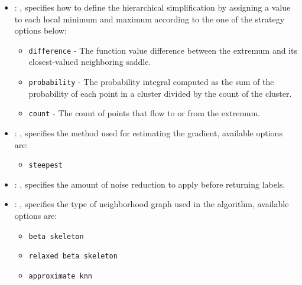 \begin{itemize}
    \item {}: , 
      specifies how                                                  to define the hierarchical
      simplification by assigning a value to each local
      minimum and maximum according to the one of the strategy options below:
      \begin{itemize}                                                    \item \texttt{difference} -
      The function value difference between the
      extremum and its closest-valued neighboring saddle.
      \item \texttt{probability} - The probability integral computed as the
      sum of the probability of each point in a cluster divided by the count of
      the cluster.                                                    \item \texttt{count} - The
      count of points that flow to or from the
      extremum.                                                  \end{itemize}

    \item {}: , 
      specifies the                                                  method used for estimating the
      gradient, available options are:
      \begin{itemize}                                                    \item \texttt{steepest}
      \end{itemize}

    \item {}: , 
      specifies the                                                  amount of noise reduction to
      apply before returning labels.

    \item {}: , 
      specifies the type                                                  of neighborhood graph used
      in the algorithm, available options are:
      \begin{itemize}                                                    \item \texttt{beta
      skeleton}                                                    \item \texttt{relaxed beta
      skeleton}                                                    \item \texttt{approximate knn}
      \end{itemize}


\end{itemize}
